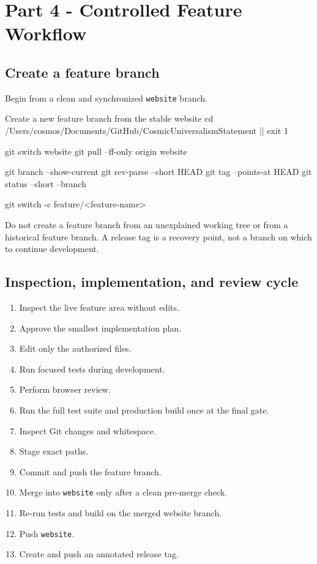 \documentclass[11pt,letterpaper]{article}
\newcommand{\branchname}[1]{\texttt{#1}}
\begin{document}
\section{Part 4 - Controlled Feature Workflow}

\subsection{Create a feature branch}

Begin from a clean and synchronized \branchname{website} branch.

\begin{commandbox}{Create a new feature branch from the stable website}
cd /Users/cosmos/Documents/GitHub/CosmicUniversalismStatement || exit 1

git switch website
git pull --ff-only origin website

git branch --show-current
git rev-parse --short HEAD
git tag --points-at HEAD
git status --short --branch

git switch -c feature/<feature-name>
\end{commandbox}

\begin{safetybox}
Do not create a feature branch from an unexplained working tree or from a
historical feature branch. A release tag is a recovery point, not a branch on
which to continue development.
\end{safetybox}

\subsection{Inspection, implementation, and review cycle}

\begin{enumerate}
    \item Inspect the live feature area without edits.
    \item Approve the smallest implementation plan.
    \item Edit only the authorized files.
    \item Run focused tests during development.
    \item Perform browser review.
    \item Run the full test suite and production build once at the final gate.
    \item Inspect Git changes and whitespace.
    \item Stage exact paths.
    \item Commit and push the feature branch.
    \item Merge into \branchname{website} only after a clean pre-merge check.
    \item Re-run tests and build on the merged website branch.
    \item Push \branchname{website}.
    \item Create and push an annotated release tag.
\end{enumerate}
\end{document}
